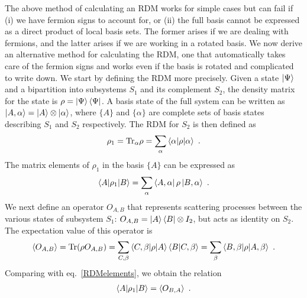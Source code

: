 The above method of calculating an RDM works for simple cases but can fail if (i) we have fermion signs to account for, or (ii) the full basis cannot be expressed as a direct product of local basis sets. The former arises if we are dealing with fermions, and the latter arises if we are working in a rotated basis. We now derive an alternative method for calculating the RDM, one that automatically takes care of the fermion signs and works even if the basis is rotated and complicated to write down. We start by defining the RDM more precisely. Given a state \(\ket{\Psi}\) and a bipartition into subsystems \(S_1\) and its complement \(S_2\), the density matrix for the state is \(\rho = \ket{\Psi}\bra{\Psi}\). A basis state of the full system can be written as \(\ket{A,\alpha} = \ket{A}\otimes\ket{\alpha}\), where \(\{A\}\) and \(\{\alpha\}\) are complete sets of basis states describing \(S_1\) and \(S_2\) respectively. The RDM for \(S_2\) is then defined as
\begin{equation}\begin{aligned}
	\rho_1 = \text{Tr}_{\alpha} \rho = \sum_\alpha \braket{\alpha | \rho | \alpha}~.
\end{aligned}\end{equation}
The matrix elements of \(\rho_1\) in the basis \(\{A\}\) can be expressed as
\begin{equation}\begin{aligned}\label{RDMelements}
	\braket{A | \rho_1 | B} = \sum_\alpha \bra{A,\alpha} \rho \ket{B,\alpha}~.
\end{aligned}\end{equation}
We next define an operator \(O_{A, B}\) that represents scattering processes between the various states of subsystem \(S_1\): \(O_{A, B} = \ket{A}\bra{B}\otimes I_2\), but acts as identity on \(S_2\). The expectation value of this operator is
\begin{equation}\begin{aligned}
	\braket{O_{A, B}} = \text{Tr}(\rho O_{A, B}) = \sum_{C,\beta}\braket{C,\beta | \rho | A}\braket{B | C,\beta} = \sum_\beta \braket{B,\beta | \rho | A,\beta}~.
\end{aligned}\end{equation}
Comparing with eq.~\ref{RDMelements}, we obtain the relation
\begin{equation}\begin{aligned}
	\braket{A | \rho_1 | B} = \braket{O_{B, A}}~.
\end{aligned}\end{equation}
